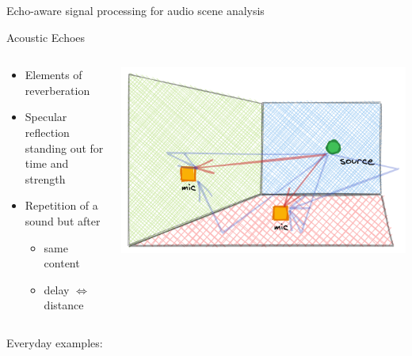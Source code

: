 \begin{frame}[t]{\alert{Echo-aware} signal processing for audio scene analysis}
\begin{mydefblock}{Acoustic Echoes}
        \vspace{-2mm}
        \begin{columns}[onlytextwidth]
            \begin{column}{0.60\textwidth}
                \begin{itemize}
                    \item Elements of reverberation
                    \item Specular reflection standing out for time and strength
                    \item Repetition of a sound but after
                    \begin{itemize}
                        \item same content
                        \item delay $\Leftrightarrow$ distance
                    \end{itemize}
                \end{itemize}
            \end{column}
            \begin{column}{0.38\textwidth}
                \centering
                \includegraphics[width=.8\textwidth]{figures/echoes}
            \end{column}

        \end{columns}
    \end{mydefblock}

    \begin{block}{Everyday examples:}


\end{block}
\end{frame}

